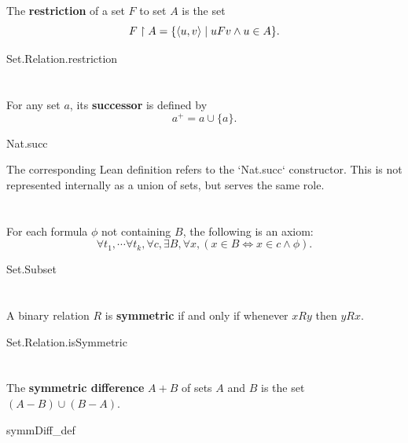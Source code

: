\documentclass{report}
\begin{document}
  The \textbf{restriction} of a set $F$ to set $A$ is the set
    $$F \restriction A = \{\left< u, v \right> \mid uFv \land u \in A\}.$$

    {Set.Relation.restriction}

\section{}%

  For any set $a$, its \textbf{successor} is defined by $$a^+ = a \cup \{a\}.$$

    {Nat.succ}

  \begin{note}
    The corresponding Lean definition refers to the `Nat.succ` constructor.
    This is not represented internally as a union of sets, but serves the same
      role.
  \end{note}

\section{}%

  For each formula $\phi$ not containing $B$, the following is an axiom:
    $$\forall t_1, \cdots \forall t_k, \forall c,
        \exists B, \forall x, (x \in B \iff x \in c \land \phi).$$

    {Set.Subset}

\section{}%

  A binary relation $R$ is \textbf{symmetric} if and only if whenever $xRy$ then
    $yRx$.

    {Set.Relation.isSymmetric}

\section{}%

  The \textbf{symmetric difference} $A + B$ of sets $A$ and $B$ is the set
    $(A - B) \cup (B - A)$.

    {symmDiff\_def}
\end{document}
